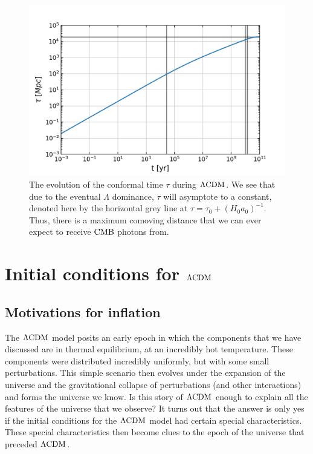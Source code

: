 \begin{figure}[!pth]
\centering     %
    \includegraphics[width=.75\columnwidth]{plots/lcdm_tau.png}
\caption{
    The evolution of the conformal time $\tau$ during $\Lambda\text{CDM}$.
    We see that
    due to the eventual $\Lambda$ dominance,
    $\tau$ will asymptote to a constant,
    denoted here by the horizontal grey line at $\tau=\tau_0+(H_0a_0)^{-1}$.
    Thus, there is a maximum comoving distance that we can ever
    expect to receive $\text{CMB}$ photons from.
}\label{fig:lcdm_tau}
\end{figure}


\section{Initial conditions for $\Lambda\text{CDM}$}
    \subsection{Motivations for inflation}
    The $\Lambda\text{CDM}$ model posits an early epoch in which the components that
    we have discussed are in thermal equilibrium,
    at an incredibly hot temperature.
    These components were distributed incredibly uniformly, but with some small perturbations.
    This simple scenario then evolves under the expansion of the universe
    and the gravitational collapse of perturbations (and other interactions) and forms the universe we know.
    Is this story of $\Lambda\text{CDM}$ enough to explain all the features of the
    universe that we observe?
    It turns out that the answer is only yes if the initial conditions for the $\Lambda\text{CDM}$
    model had certain special characteristics.
    These special characteristics then become clues to the epoch of the universe
    that preceded $\Lambda\text{CDM}$.


